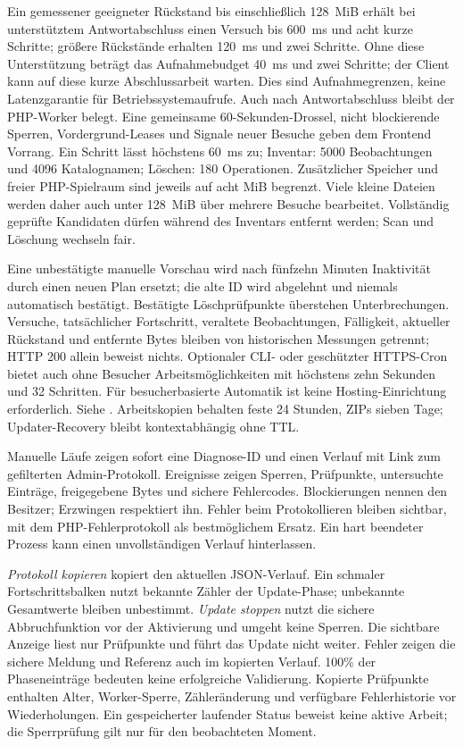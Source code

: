 \documentclass[11pt,a4paper]{article}
\newcommand{\filepath}[1]{\path{#1}}
\begin{document}
Ein gemessener geeigneter Rückstand bis einschließlich 128~MiB erhält bei
unterstütztem Antwortabschluss einen Versuch bis 600~ms und acht kurze Schritte;
größere Rückstände erhalten 120~ms und zwei Schritte. Ohne diese Unterstützung
beträgt das Aufnahmebudget 40~ms und zwei Schritte; der Client kann auf diese
kurze Abschlussarbeit warten. Dies sind Aufnahmegrenzen, keine Latenzgarantie
für Betriebssystemaufrufe. Auch nach Antwortabschluss bleibt der PHP-Worker
belegt. Eine gemeinsame 60-Sekunden-Drossel, nicht blockierende Sperren,
Vordergrund-Leases und Signale neuer Besuche geben dem Frontend Vorrang. Ein
Schritt lässt höchstens 60~ms zu; Inventar: 5000 Beobachtungen und 4096
Katalognamen; Löschen: 180 Operationen. Zusätzlicher Speicher und freier
PHP-Spielraum sind jeweils auf acht MiB begrenzt. Viele kleine Dateien werden
daher auch unter 128~MiB über mehrere Besuche bearbeitet. Vollständig geprüfte
Kandidaten dürfen während des Inventars entfernt werden; Scan und Löschung
wechseln fair.

Eine unbestätigte manuelle Vorschau wird nach fünfzehn Minuten Inaktivität durch
einen neuen Plan ersetzt; die alte ID wird abgelehnt und niemals automatisch
bestätigt. Bestätigte Löschprüfpunkte überstehen Unterbrechungen. Versuche,
tatsächlicher Fortschritt, veraltete Beobachtungen, Fälligkeit, aktueller
Rückstand und entfernte Bytes bleiben von historischen Messungen getrennt; HTTP
200 allein beweist nichts. Optionaler CLI- oder geschützter HTTPS-Cron bietet
auch ohne Besucher Arbeitsmöglichkeiten mit höchstens zehn Sekunden und 32
Schritten. Für besucherbasierte Automatik ist keine Hosting-Einrichtung
erforderlich. Siehe \filepath{docs/CACHE_MAINTENANCE.md}. Arbeitskopien behalten
feste 24 Stunden, ZIPs sieben Tage; Updater-Recovery bleibt kontextabhängig ohne
TTL.

Manuelle Läufe zeigen sofort eine Diagnose-ID und einen Verlauf mit Link zum
gefilterten Admin-Protokoll. Ereignisse zeigen Sperren, Prüfpunkte, untersuchte
Einträge, freigegebene Bytes und sichere Fehlercodes. Blockierungen nennen den
Besitzer; Erzwingen respektiert ihn. Fehler beim Protokollieren bleiben
sichtbar,
mit dem PHP-Fehlerprotokoll als bestmöglichem Ersatz. Ein hart beendeter Prozess
kann einen unvollständigen Verlauf hinterlassen.

\emph{Protokoll kopieren} kopiert den aktuellen JSON-Verlauf. Ein schmaler
Fortschrittsbalken nutzt bekannte Zähler der Update-Phase; unbekannte
Gesamtwerte
bleiben unbestimmt. \emph{Update stoppen} nutzt die sichere Abbruchfunktion vor
der Aktivierung und umgeht keine Sperren. Die sichtbare Anzeige liest nur
Prüfpunkte und führt das Update nicht weiter.
Fehler zeigen die sichere Meldung und Referenz auch im kopierten Verlauf.
100\% der Phaseneinträge bedeuten keine erfolgreiche Validierung.
Kopierte Prüfpunkte enthalten Alter, Worker-Sperre, Zähleränderung und
verfügbare
Fehlerhistorie vor Wiederholungen. Ein gespeicherter laufender Status beweist
keine aktive Arbeit; die Sperrprüfung gilt nur für den beobachteten Moment.
\end{document}
